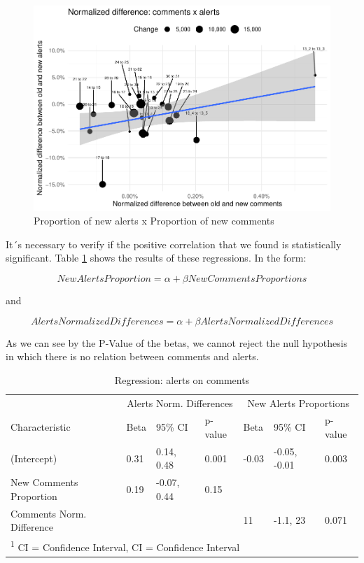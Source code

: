 \documentclass[
]{article}
\begin{document}
\begin{figure}
\centering
\includegraphics{report_files/figure-latex/unnamed-chunk-23-1.pdf}
\caption{\label{scatter_diff}Proportion of new alerts x Proportion of
new comments}
\end{figure}

\normalsize

It´s necessary to verify if the positive correlation that we found is
statistically significant. Table \ref{tab_reg} shows the results of
these regressions. In the form:

\[ NewAlertsProportion = \alpha + \beta NewCommentsProportions \]

and

\[ AlertsNormalizedDifferences = \alpha + \beta AlertsNormalizedDifferences \]

As we can see by the P-Value of the betas, we cannot reject the null
hypothesis in which there is no relation between comments and alerts.

\small

\begin{table}

\caption{\label{tab:unnamed-chunk-24}\label{tab_reg} Regression: alerts on comments}
\centering
\begin{tabular}[t]{l|l|l|l|l|l|l}
\hline
\multicolumn{1}{c|}{ } & \multicolumn{3}{c|}{Alerts Norm. Differences} & \multicolumn{3}{c}{New Alerts Proportions} \\
\cline{2-4} \cline{5-7}
Characteristic & Beta & 95\% CI & p-value & Beta & 95\% CI & p-value\\
\hline
(Intercept) & 0.31 & 0.14, 0.48 & 0.001 & -0.03 & -0.05, -0.01 & 0.003\\
\hline
New Comments Proportion & 0.19 & -0.07, 0.44 & 0.15 &  &  & \\
\hline
Comments Norm. Difference &  &  &  & 11 & -1.1, 23 & 0.071\\
\hline
\multicolumn{7}{l}{\textsuperscript{1} CI = Confidence Interval, CI = Confidence Interval}\\
\end{tabular}
\end{table}
\end{document}
